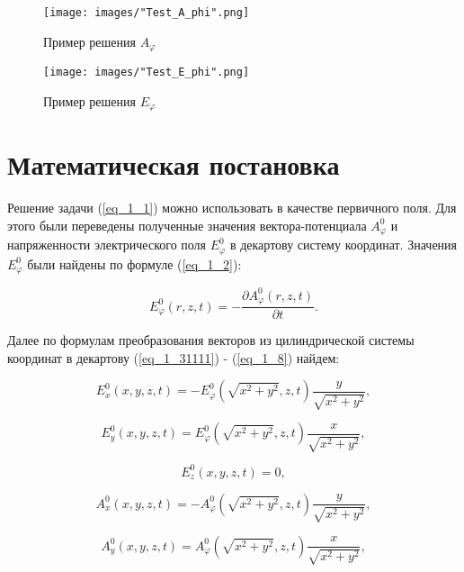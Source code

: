 \begin{figure}
	\centering
	\texttt{[image: images/"Test\_A\_phi".png]}
	\caption{Пример решения $A_{\varphi}$}
	\label{fig:Test_A_phi}
\end{figure}

\begin{figure}
	\centering
	\texttt{[image: images/"Test\_E\_phi".png]}
	\caption{Пример решения $E_{\varphi}$}
	\label{fig:Test_E_phi}
\end{figure}

\section{Математическая постановка}

Решение задачи (\ref{eq_1_1}) можно использовать в качестве первичного поля. Для этого были переведены полученные значения вектора-потенциала $A^0_{\varphi}$ и напряженности электрического поля  $E^0_{\varphi}$ в декартову систему координат. Значения $E^0_{\varphi}$ были найдены по формуле (\ref{eq_1_2}):

\begin{equation} \label{eq_1_2}
	E^0_{\varphi}(r, z, t) = -\frac{\partial A^0_{\varphi}(r, z, t)}{\partial t}.
\end{equation}

Далее по формулам преобразования векторов из цилиндрической системы координат в декартову (\ref{eq_1_31111}) - (\ref{eq_1_8}) найдем:

\begin{equation} \label{eq_1_31111}
	E_x^0(x, y, z, t) = -E_{\varphi}^0(\sqrt{x^2 + y^2}, z, t)\frac{y}{\sqrt{x^2 + y^2}},
\end{equation}

\begin{equation} \label{eq_1_4}
	E_y^0(x, y, z, t) = E_{\varphi}^0(\sqrt{x^2 + y^2}, z, t)\frac{x}{\sqrt{x^2 + y^2}},
\end{equation}

\begin{equation} \label{eq_1_5}
	E_z^0(x, y, z, t) = 0,
\end{equation}

\begin{equation} \label{eq_1_6}
	A_x^0(x, y, z, t) = -A_{\varphi}^0(\sqrt{x^2 + y^2}, z, t)\frac{y}{\sqrt{x^2 + y^2}},
\end{equation}

\begin{equation} \label{eq_1_7}
	A_y^0(x, y, z, t) = A_{\varphi}^0(\sqrt{x^2 + y^2}, z, t)\frac{x}{\sqrt{x^2 + y^2}},
\end{equation}

